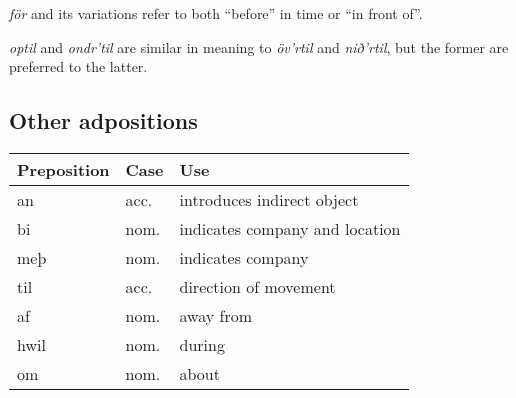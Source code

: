 \textit{för} and its variations refer to both ``before'' in time or ``in front of''.

\textit{optil} and \textit{ondr'til} are similar in meaning to \textit{öv'rtil} and \textit{nið'rtil}, but the former are preferred to the latter.

\subsection{Other adpositions}

\begin{center}
\begin{tabular}{lll}
Preposition & Case & Use \\
\hline
an   & acc. & introduces indirect object \\
bi   & nom. & indicates company and location \\
meþ  & nom. & indicates company \\
til  & acc. & direction of movement \\
af   & nom. & away from \\
hwil & nom. & during \\
om   & nom. & about \\
\end{tabular}
\end{center}
